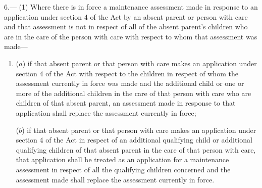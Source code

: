 \documentclass[a4paper,12pt]{article}
\begin{document}
6.—%
%
%
%
%
%
(1) Where there is in force a maintenance assessment made in response to an application under section 4 of the Act by an absent parent or person with care and that assessment is not in respect of all of the absent parent’s children who are in the care of the person with care with respect to whom that assessment was made—
\begin{enumerate}\item[]
($a$) if that absent parent or that person with care makes an application under section 4 of the Act with respect to the children in respect of whom the assessment currently in force was made and the additional child or one or more of the additional children in the care of that person with care who are children of that absent parent, an assessment made in response to that application shall replace the assessment currently in force;

($b$) if that absent parent or that person with care makes an application under section 4 of the Act in respect of an additional qualifying child or additional qualifying children of that absent parent in the care of that person with care, that application shall be treated as an application for a maintenance assessment in respect of all the qualifying children concerned and the assessment made shall replace the assessment currently in force.
\end{enumerate}
\end{document}
